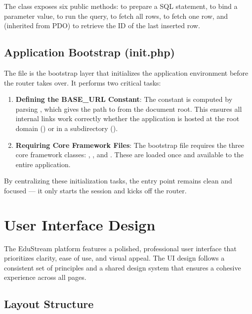\documentclass[12pt,a4paper]{report}
\begin{document}
The class exposes six public methods:  to prepare a SQL statement,  to bind a parameter value,  to run the query,  to fetch all rows,  to fetch one row, and  (inherited from PDO) to retrieve the ID of the last inserted row.

\subsection{Application Bootstrap (init.php)}

The  file is the bootstrap layer that initializes the application environment before the  router takes over. It performs two critical tasks:

\begin{enumerate}
    \item \textbf{Defining the BASE\_URL Constant}: The  constant is computed by parsing , which gives the path to  from the document root. This ensures all internal links work correctly whether the application is hosted at the root domain () or in a subdirectory ().
    
    \item \textbf{Requiring Core Framework Files}: The bootstrap file requires the three core framework classes: , , and . These are loaded once and available to the entire application.
\end{enumerate}

By centralizing these initialization tasks, the  entry point remains clean and focused — it only starts the session and kicks off the router.

\section{User Interface Design}

The EduStream platform features a polished, professional user interface that prioritizes clarity, ease of use, and visual appeal. The UI design follows a consistent set of principles and a shared design system that ensures a cohesive experience across all pages.

\subsection{Layout Structure}
\end{document}
